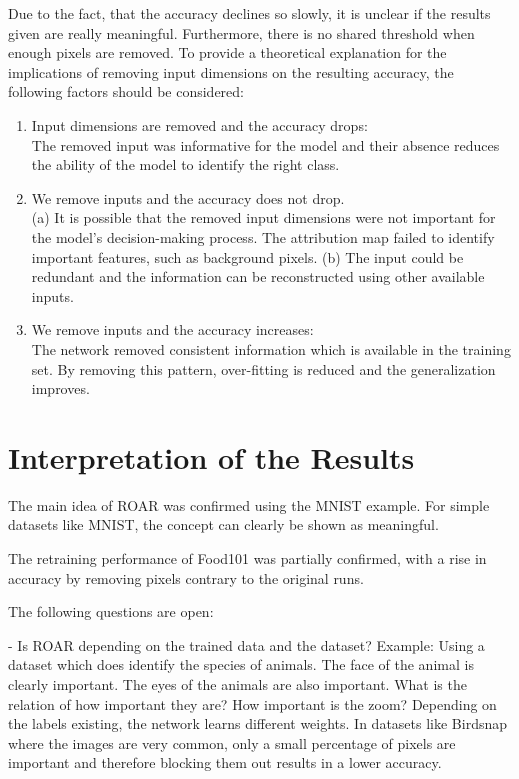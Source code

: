 Due to the fact, that the accuracy declines so slowly, it is unclear if the results given are really meaningful. Furthermore, there is no shared threshold when enough pixels are removed.
To provide a theoretical explanation for the implications of removing input dimensions on the resulting accuracy, the following factors should be considered:

\begin{enumerate}
	\item Input dimensions are removed and the accuracy drops:\\ The removed input was informative for the model and
	their absence reduces the ability of the model to identify the right class.
	
	\item We remove inputs and the accuracy does not drop.\\ (a) It is possible that the removed input dimensions	were not important for the model’s decision-making	process. The attribution map failed to identify important features, such as background pixels. (b) The input could be redundant and the information can be reconstructed using other available inputs. 
	
	\item We remove inputs and the accuracy increases:\\ The network removed consistent information which is available in the training set. By removing this pattern, over-fitting is reduced and the generalization improves.
\end{enumerate}


\section{Interpretation of the Results}

The main idea of ROAR was confirmed using the MNIST example. For simple datasets like MNIST, the concept can clearly be shown as meaningful.

The retraining performance of Food101 was partially confirmed, with a rise in accuracy by removing pixels contrary to the original runs.

The following questions are open:

- Is ROAR depending on the trained data and the dataset? Example: Using a dataset which does identify the species of animals. The face of the animal is clearly important. The eyes of the animals are also important. What is the relation of how important they are? How important is the zoom? Depending on the labels existing, the network learns different weights. In datasets like Birdsnap where the images are very common, only a small percentage of pixels are important and therefore blocking them out results in a lower accuracy.



